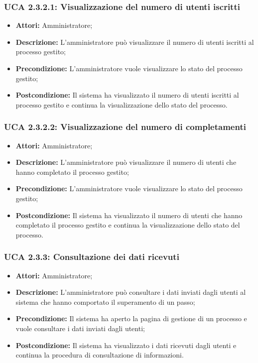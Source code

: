 \hypertarget{A2.3.2.1}{}
\subsubsection{UCA 2.3.2.1: Visualizzazione del numero di utenti iscritti}
\begin{itemize}
\item \textbf{Attori:}
 Amministratore;
\item \textbf{Descrizione:} 
L'amministratore può visualizzare il numero di utenti iscritti al processo gestito; 
\item \textbf{Precondizione:} 
L'amministratore vuole visualizzare lo stato del processo gestito;
\item \textbf{Postcondizione:} 
Il sistema ha visualizzato il numero di utenti iscritti al processo gestito e continua la visualizzazione dello stato del processo.
\end{itemize}

\hypertarget{A2.3.2.2}{}
\subsubsection{UCA 2.3.2.2: Visualizzazione del numero di completamenti}
\begin{itemize}
\item \textbf{Attori:}
 Amministratore;
\item \textbf{Descrizione:} 
L'amministratore può visualizzare il numero di utenti che hanno completato il processo gestito; 
\item \textbf{Precondizione:} 
L'amministratore vuole visualizzare lo stato del processo gestito;
\item \textbf{Postcondizione:} 
Il sistema ha visualizzato il numero di utenti che hanno completato il processo gestito e continua la visualizzazione dello stato del processo.
\end{itemize}

\hypertarget{A2.3.3}{}
\subsubsection{UCA 2.3.3: Consultazione dei dati ricevuti}
\begin{itemize}
\item \textbf{Attori:} Amministratore;
\item \textbf{Descrizione:} 
L'amministratore può consultare i dati inviati dagli utenti al sistema che hanno comportato il superamento di un passo;
\item \textbf{Precondizione:} 
Il sistema ha aperto la pagina di gestione di un processo e vuole consultare i dati inviati dagli utenti;
\item \textbf{Postcondizione:} 
Il sistema ha visualizzato i dati ricevuti dagli utenti e continua la procedura di consultazione di informazioni.
\end{itemize}

